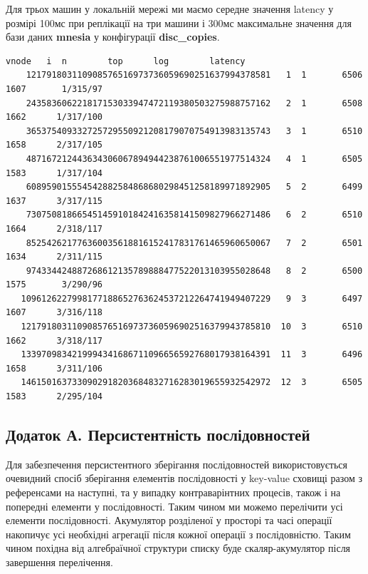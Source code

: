 \documentclass[11pt,oneside]{article}
\begin{document}
Для трьох машин у локальній мережі ми маємо середне значення latency у розмірі 100мс
при реплікації на три машини і 300мс максимальне значення для бази даних {\bf mnesia}
у конфігурації {\bf disc\_copies}.

\begin{center}
\begin{lstlisting}[mathescape=true,basicstyle=\tiny]
                                               vnode   i  n        top      log        latency
    121791803110908576516973736059690251637994378581   1  1       6506     1607       1/315/97
    243583606221817153033947472119380503275988757162   2  1       6508     1662      1/317/100
    365375409332725729550921208179070754913983135743   3  1       6510     1658      2/317/105
    487167212443634306067894944238761006551977514324   4  1       6505     1583      1/317/104
    608959015554542882584868680298451258189971892905   5  2       6499     1637      3/317/115
    730750818665451459101842416358141509827966271486   6  2       6510     1664      2/318/117
    852542621776360035618816152417831761465960650067   7  2       6501     1634      2/311/115
    974334424887268612135789888477522013103955028648   8  2       6500     1575       3/290/96
   1096126227998177188652763624537212264741949407229   9  3       6497     1607      3/316/118
   1217918031109085765169737360596902516379943785810  10  3       6510     1662      3/318/117
   1339709834219994341686711096656592768017938164391  11  3       6496     1658      3/311/106
   1461501637330902918203684832716283019655932542972  12  3       6505     1583      2/295/104
\end{lstlisting}
\end{center}


\newpage
\subsection*{Додаток А. Персистентність послідовностей}

Для забезпечення персистентного зберігання послідовностей використовується
очевидний спосіб зберігання елементів послідовності у key-value сховищі разом
з референсами на наступні, та у випадку контраварінтних процесів, також і на
попередні елементи у послідовності. Таким чином ми можемо перелічити усі
елементи послідовності. Акумулятор розділеної у просторі та часі операції
накопичує усі необхідні агрегації після кожної операції з послідовністю. Таким
чином похідна від алгебраїчної структури списку буде скаляр-акумулятор після
завершення перелічення.
\end{document}
